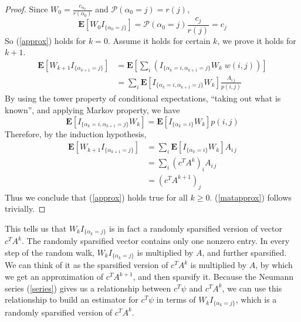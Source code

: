 \documentclass[a4paper,11pt]{article}
\theoremstyle{remark}
\theoremstyle{definition}
\begin{document}
        \begin{proof}
            Since $W_0 = \frac{c_{\alpha_0}}{r(\alpha_0)}$ and
            $\mathcal{P}(\alpha_0 = j) = r(j)$,
            \[ \mathbf{E}[W_0 I_{\{\alpha_0 = j\}}]
                = \mathcal{P}(\alpha_0 = j) \frac{c_j}{r(j)} = c_j
            \]
            So (\ref{approx}) holds for $k=0$.  Assume it holds for certain $k$,
            we prove it holds for $k+1$.
            \[ \begin{split}
                \mathbf{E}[W_{k+1} I_{\{\alpha_{k+1} = j\}}]
                &= \mathbf{E}\left[ \sum_i \left( I_{\{\alpha_k = i,
                    \alpha_{k+1} = j\}} W_k \; w(i,j) \right)\right] \\
                &= \sum_i \mathbf{E}\left[ I_{\{\alpha_k = i,
                    \alpha_{k+1} = j\}} W_k \right] \frac{A_{i\,j}}{p(i,j)}
            \end{split} \]
            By using the tower property of conditional expectations,
            ``taking out what is known'', and applying Markov property, we have
            \[ \mathbf{E}\left[ I_{\{\alpha_k = i,
                                     \alpha_{k+1} = j\}} W_k \right]
                = \mathbf{E}\left[ I_{\{\alpha_k = i\}} W_k \right] p(i,j)
            \]
            Therefore, by the induction hypothesis,
            \[ \begin{split}
                \mathbf{E}[W_{k+1} I_{\{\alpha_{k+1} = j\}}]
                &= \sum_i \mathbf{E}\left[ I_{\{\alpha_k = i\}} W_k \right]
                          A_{i\,j} \\
                &= \sum_i  \left(c^T A^k\right)_i A_{i\,j} \\
                &= \left(c^T A^{k+1}\right)_j
            \end{split} \]
            Thus we conclude that (\ref{approx}) holds true for all
            $k\ge 0$. (\ref{matapprox}) follows trivially.
        \end{proof}
        This tells us that $W_k I_{\{\alpha_k = j\}}$ is in fact a randomly
        sparsified version of vector $c^T A^k$.  The randomly sparsified
        vector contains only one nonzero entry.  In every step of the random
        walk, $W_k I_{\{\alpha_k = j\}}$ is multiplied by $A$, and further
        sparsified. We can think of it as the sparsified version of $c^T A^k$
        is multiplied by $A$, by which we get an approximation of
        $c^T A^{k+1}$, and then sparsify it.  Because the Neumann series
        (\ref{series}) gives us a relationship between $c^T\psi$ and
        $c^T A^k$, we can use this relationship to build an estimator
        for $c^T \psi$ in terms of $W_k I_{\{\alpha_k = j\}}$, which is
        a randomly sparsified version of $c^T A^k$.
        
\end{document}
